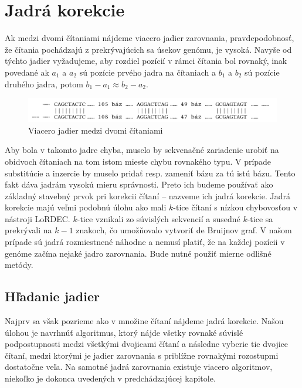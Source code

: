 \section{Jadrá korekcie}

Ak medzi dvomi čítaniami nájdeme viacero jadier zarovnania, pravdepodobnosť, že čítania pochádzajú z prekrývajúcich sa úsekov genómu, je vysoká. Navyše od týchto jadier vyžadujeme, aby rozdiel pozícií v rámci čítania bol rovnaký, inak povedané ak $a_{1}$ a $a_{2}$ sú pozície prvého jadra na čítaniach a $b_{1}$ a $b_{2}$ sú pozície druhého jadra, potom $b_{1} - a_{1} \approx b_{2} - a_{2}$.

\begin{figure}
    \centering
    \includegraphics[width=1\textwidth]{images/jadra_korekcie.png}
    \caption{Viacero jadier medzi dvomi čítaniami}
    \label{fig:jadra_korekcie}
\end{figure} 

Aby bola v takomto jadre chyba, muselo by sekvenačné zariadenie urobiť na obidvoch čítaniach na tom istom mieste chybu rovnakého typu. V prípade substitúcie a inzercie by muselo  pridať resp. zameniť bázu za tú istú bázu. Tento fakt dáva jadrám vysokú mieru správnosti. Preto ich budeme používať ako základný stavebný prvok pri korekcii čítaní -- nazveme ich jadrá korekcie. 
Jadrá korekcie majú veľmi podobnú úlohu ako mali $k$-tice čítaní s nízkou chybovosťou v nástroji LoRDEC. $k$-tice vznikali zo súvislých sekvencií a susedné $k$-tice sa prekrývali na $k - 1$ znakoch, čo umožňovalo vytvoriť de Bruijnov graf. V našom prípade sú jadrá rozmiestnené náhodne a nemusí platiť, že na každej pozícii v genóme začína nejaké jadro zarovnania. Bude nutné použiť mierne odlišné metódy.

\subsection{Hľadanie jadier}

Najprv sa však pozrieme ako v množine čítaní nájdeme jadrá korekcie. Našou úlohou je navrhnúť algoritmus, ktorý nájde všetky rovnaké súvislé podpostupnosti medzi všetkými dvojicami čítaní a následne vyberie tie dvojice čítaní, medzi ktorými je jadier zarovnania s priblížne rovnakými rozostupmi dostatočne veľa. Na samotné jadrá zarovnania existuje viacero algoritmov, niekoľko je dokonca uvedených v predchádzajúcej kapitole.


